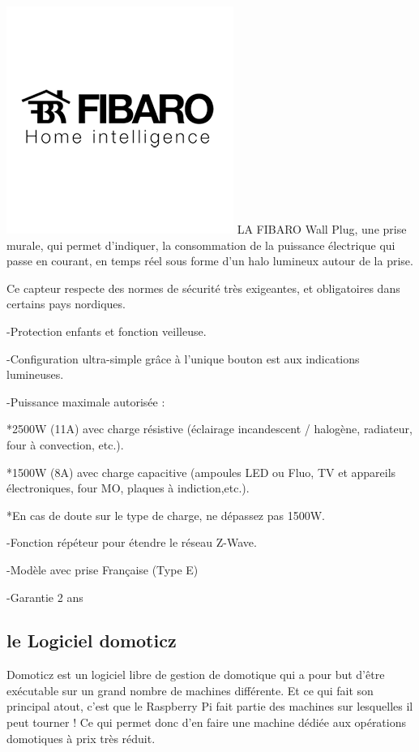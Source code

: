 \includegraphics[scale=0.5]{./Images/png/Fibaro.png}\newline
LA FIBARO Wall Plug, une prise murale, qui permet d'indiquer, la consommation de la puissance électrique qui passe en courant, en temps réel sous forme d'un halo lumineux autour de la prise.

Ce capteur respecte des normes de sécurité très exigeantes, et obligatoires dans certains pays nordiques.


-Protection enfants et fonction veilleuse.


-Configuration ultra-simple grâce à l'unique bouton est aux indications lumineuses.


-Puissance maximale autorisée :

    *2500W (11A) avec charge résistive (éclairage incandescent / halogène, radiateur, four à convection, etc.).
    

    *1500W (8A) avec charge capacitive (ampoules LED ou Fluo, TV et appareils électroniques, four MO, plaques à indiction,etc.).
    
    
    *En cas de doute sur le type de charge, ne dépassez pas 1500W.


-Fonction répéteur pour étendre le réseau Z-Wave.


-Modèle avec prise Française (Type E)


-Garantie 2 ans 
\subsection{le Logiciel domoticz}
Domoticz est un logiciel libre de gestion de domotique qui a pour but d’être exécutable sur un grand nombre de machines différente. Et ce qui fait son principal atout, c’est que le Raspberry Pi fait partie des machines sur lesquelles il peut tourner ! Ce qui permet donc d’en faire une machine dédiée aux opérations domotiques à prix très réduit. 

